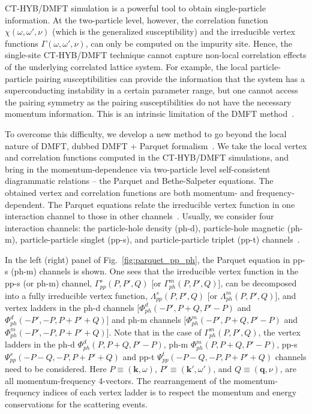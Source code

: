 CT-HYB/DMFT simulation is a powerful tool to obtain single-particle information. At the two-particle level, however, the correlation function $\chi(\omega,\omega',\nu)$ (which is the generalized susceptibility) and the irreducible vertex functions $\Gamma(\omega,\omega',\nu)$, can only be computed on the impurity site. Hence, the single-site CT-HYB/DMFT technique cannot capture non-local correlation effects of the underlying correlated lattice system. For example, the local particle-particle pairing susceptibilities can provide the information that the system has a superconducting instability in a certain parameter range, but one cannot access the pairing symmetry as the pairing susceptibilities do not have the necessary momentum information. This is an intrinsic limitation of the DMFT method~\cite{RevModPhys.68.13,RevModPhys.77.1027,RevModPhys.78.865}. 

To overcome this difficulty, we develop a new method to go beyond the local nature of DMFT, dubbed DMFT + Parquet formalism~\cite{Meng14a,Meng14b}. We take the local vertex and correlation functions computed in the CT-HYB/DMFT simulations, and bring in the momentum-dependence via two-particle level self-consistent diagrammatic relations -- the Parquet and Bethe-Salpeter equations. The obtained vertex and correlation functions are both momentum- and frequency-dependent. The Parquet equations relate the irreducible vertex function in one interaction channel to those in other channels~\cite{Dominicis64a,Dominicis64b}. Usually, we consider four interaction channels: the particle-hole density (ph-d), particle-hole magnetic (ph-m), particle-particle singlet (pp-s), and particle-particle triplet (pp-t) channels~\cite{PhysRevB.43.8044,PhysRevE.80.046706,PhysRevB.86.125114,PhysRevE.87.013311,PhysRevB.88.041103,PhysRevB.88.245110}. 

In the left (right) panel of Fig.~\ref{fig:parquet_pp_ph}, the Parquet equation in pp-s (ph-m) channels is shown. One sees that the irreducible vertex function in the pp-s (or ph-m) channel, $\Gamma^{s}_{pp}(P,P',Q)$ [or $\Gamma^{m}_{ph}(P,P',Q)$], can be decomposed into a fully irreducible vertex function, $\Lambda^{s}_{pp}(P,P',Q)$ [or $\Lambda^{m}_{ph}(P,P',Q)$], and vertex ladders in the ph-d channels [$\Phi^{d}_{ph}(-P',P+Q,P'-P)$ and $\Phi^{d}_{ph}(-P',-P,P+P'+Q)$] and ph-m channels [$\Phi^{m}_{ph}(-P',P+Q,P'-P)$ and $\Phi^{m}_{ph}(-P',-P,P+P'+Q)$]. Note that in the case of $\Gamma^{m}_{ph}(P,P',Q)$, the vertex ladders in the ph-d $\Phi^{d}_{ph}(P,P+Q,P'-P)$, ph-m $\Phi^{m}_{ph}(P,P+Q,P'-P)$, pp-s $\Psi^{s}_{pp}(-P-Q,-P,P+P'+Q)$ and pp-t $\Psi^{t}_{pp}(-P-Q,-P,P+P'+Q)$ channels need to be considered. Here $P\equiv(\mathbf{k},\omega)$, $P'\equiv(\mathbf{k'},\omega')$, and $Q\equiv(\mathbf{q},\nu)$, are all momentum-frequency 4-vectors. The rearrangement of the momentum-frequency indices of each vertex ladder is to respect the momentum and energy conservations for the scattering events.

